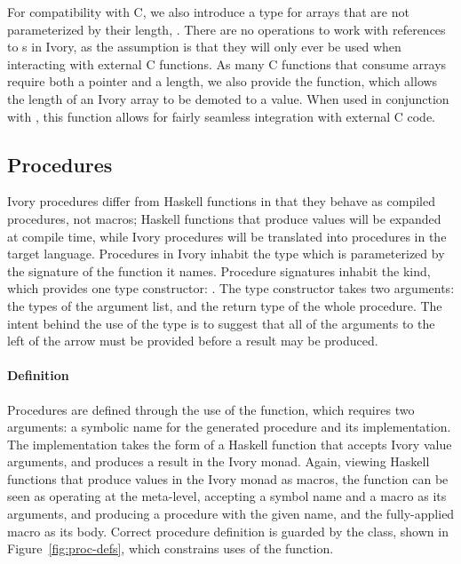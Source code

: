 For compatibility with C, we also introduce a type for arrays that are not
parameterized by their length, .  There are no operations to work
with references to s in Ivory, as the assumption is that they will
only ever be used when interacting with external C functions.  As many C
functions that consume arrays require both a pointer and a length, we also
provide the  function, which allows the length of an Ivory array to
be demoted to a value.  When used in conjunction with , this
function allows for fairly seamless integration with external C code.


\subsection{Procedures}
\label{sec:proc}

Ivory procedures differ from Haskell functions in that they behave as compiled
procedures, not macros; Haskell functions that produce  values will be
expanded at compile time, while Ivory procedures will be translated into
procedures in the target language.  Procedures in Ivory inhabit the 
type which is parameterized by the signature of the function it names.
Procedure signatures inhabit the  kind, which provides one type
constructor: \cd{:->}.  The \cd{:->} type constructor takes two arguments: the
types of the argument list, and the return type of the whole procedure.  The
intent behind the use of the \cd{:->} type is to suggest that all of the
arguments to the left of the arrow must be provided before a result may be
produced.

\paragraph{Definition}

Procedures are defined through the use of the  function, which requires
two arguments: a symbolic name for the generated procedure and its
implementation.  The implementation takes the form of a Haskell function that
accepts Ivory value arguments, and produces a result in the Ivory monad.  Again,
viewing Haskell functions that produce values in the Ivory monad as macros, the
 function can be seen as operating at the meta-level, accepting a
symbol name and a macro as its arguments, and producing a procedure with the given
name, and the fully-applied macro as its body.  Correct procedure definition is
guarded by the  class, shown in Figure~\ref{fig:proc-defs},
which constrains uses of the  function.

